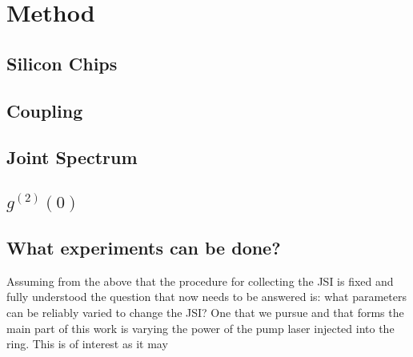 \section{Method}
\subsection{Silicon Chips}
\subsection{Coupling}
\subsection{Joint Spectrum}
\subsection{$g^{(2)}(0)$}
\subsection{What experiments can be done?}
Assuming from the above that the procedure for collecting the JSI is fixed and fully understood the question that now needs to be answered is: what parameters can be reliably varied to change the JSI?
One that we pursue and that forms the main part of this work is varying the power of the pump laser injected into the ring. This is of interest as it may 

